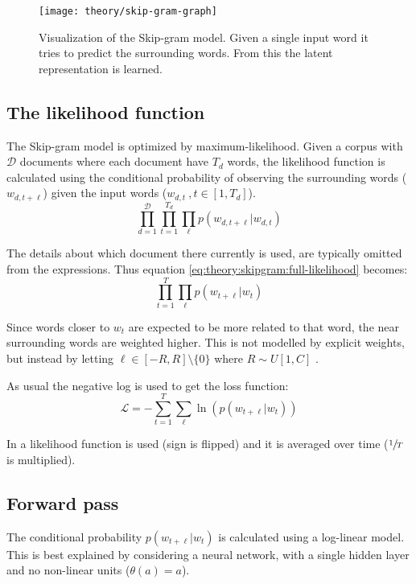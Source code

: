 \begin{figure}[h]
	\centering
	\texttt{[image: theory/skip-gram-graph]}
	\caption{Visualization of the Skip-gram model. Given a single input word it tries to predict the surrounding words. From this the latent representation is learned.}
	\label{fig:theory:skip-gram:graph}
\end{figure}

\subsection{The likelihood function}
The Skip-gram model is optimized by maximum-likelihood. Given a corpus with $\mathcal{D}$ documents where each document have $T_d$ words, the likelihood function is calculated using the conditional probability of observing the surrounding words ($w_{d, t + \ell}$) given the input words ($w_{d, t}\ , t \in [1, T_d]$).
\begin{equation}
\prod_{d = 1}^{\mathcal{D}} \prod_{t = 1}^{T_d} \prod_{\ell} p(w_{d, t + \ell} | w_{d, t})
\label{eq:theory:skipgram:full-likelihood}
\end{equation}

The details about which document there currently is used, are typically omitted from the expressions. Thus equation \eqref{eq:theory:skipgram:full-likelihood} becomes:
\begin{equation}
\prod_{t = 1}^{T} \prod_{\ell} p(w_{t + \ell} | w_{t})
\end{equation}

Since words closer to $w_t$ are expected to be more related to that word, the near surrounding words are weighted higher. This is not modelled by explicit weights, but instead by letting $\ell \in [-R, R] \setminus \{ 0 \}$ where $R \sim U[1, C]$ \cite{word2vec-comparing}.

As usual the negative log is used to get the loss function:
\begin{equation}
\mathcal{L} = - \sum_{t = 1}^T \sum_{\ell} \ln( p(w_{t + \ell} | w_t) )
\end{equation}

In \cite{word2vec-details} a likelihood function is used (sign is flipped) and it is averaged over time ($\sfrac{1}{T}$ is multiplied).

\subsection{Forward pass}
The conditional probability $p(w_{t + \ell} | w_t)$ is calculated using a log-linear model. This is best explained by considering a neural network, with a single hidden layer and no non-linear units ($\theta(a) = a$).

